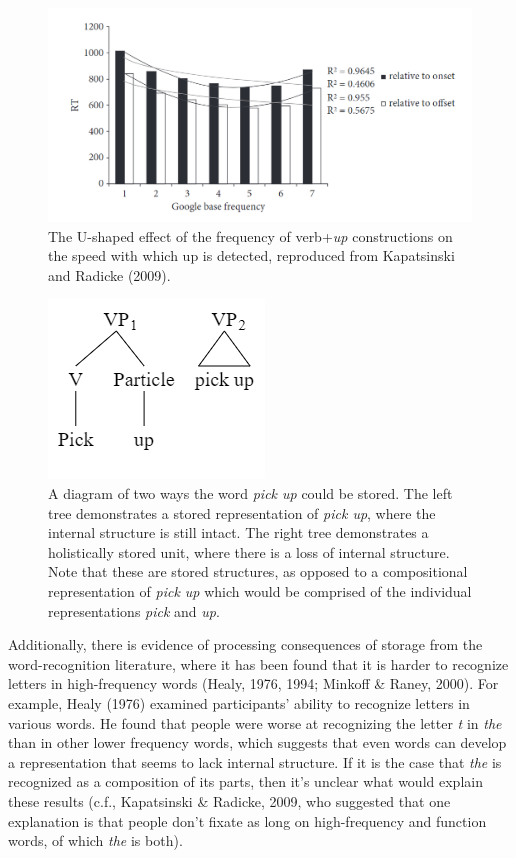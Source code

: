 \documentclass[
  man,floatsintext]{apa6}
\begin{document}
\begin{figure}

{\centering \includegraphics[width=0.7\linewidth]{Figures/kapatsinskiradicke_graph} 

}

\caption{The U-shaped effect of the frequency of verb+\emph{up} constructions on the speed with which up is detected, reproduced from Kapatsinski and Radicke (2009).}\label{fig:kapatsinskiplot}
\end{figure}



\begin{figure}

{\centering \includegraphics[width=0.3\linewidth]{Figures/syntax_tree} 

}

\caption{A diagram of two ways the word \emph{pick up} could be stored. The left tree demonstrates a stored representation of \emph{pick up}, where the internal structure is still intact. The right tree demonstrates a holistically stored unit, where there is a loss of internal structure. Note that these are stored structures, as opposed to a compositional representation of \emph{pick up} which would be comprised of the individual representations \emph{pick} and \emph{up}.}\label{fig:lossInternal}
\end{figure}

Additionally, there is evidence of processing consequences of storage from the word-recognition literature, where it has been found that it is harder to recognize letters in high-frequency words (Healy, 1976, 1994; Minkoff \& Raney, 2000). For example, Healy (1976) examined participants' ability to recognize letters in various words. He found that people were worse at recognizing the letter \emph{t} in \emph{the} than in other lower frequency words, which suggests that even words can develop a representation that seems to lack internal structure. If it is the case that \emph{the} is recognized as a composition of its parts, then it's unclear what would explain these results (c.f., Kapatsinski \& Radicke, 2009, who suggested that one explanation is that people don't fixate as long on high-frequency and function words, of which \emph{the} is both).
\end{document}
